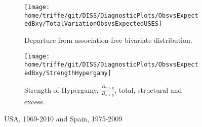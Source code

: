 \begin{figure}
        \centering
        \begin{subfigure}[b]{0.9\textwidth}
                \centering
                 \caption{Departure from association-free bivariate
                 distribution. }
                \texttt{[image: home/triffe/git/DISS/DiagnosticPlots/ObsvsExpectedBxy/TotalVariationObsvsExpectedUSES]}
                \label{fig:Theta}
        \end{subfigure}
        \quad
        \begin{subfigure}[b]{0.9\textwidth}
                \centering
                \caption{Strength of Hypergamy, $\frac{B_{x>y}}{B_{x<y}}$,
                total, structural and excess. }
                \texttt{[image: home/triffe/git/DISS/DiagnosticPlots/ObsvsExpectedBxy/StrengthHypergamy]}      
                \label{fig:HypergamyStrength}
        \end{subfigure}
        \caption{USA, 1969-2010 and Spain, 1975-2009}\label{fig:obsexp2}
\end{figure}








